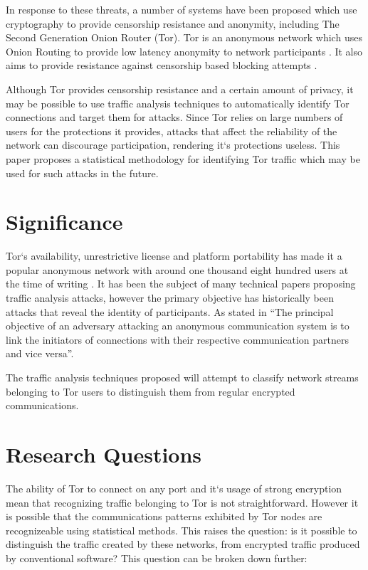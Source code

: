 \documentclass{conference}
\begin{document}
In response to these threats, a number of systems have been proposed which use cryptography to provide censorship resistance and anonymity, including The Second Generation Onion Router (Tor). Tor is an anonymous network which uses Onion Routing to provide low latency anonymity to network participants \parencite{Dingledine:2004p314}. It also aims to provide resistance against censorship based blocking attempts \parencite{Dingledine:2008p1542}.

Although Tor provides censorship resistance and a certain amount of privacy, it may be possible to use traffic analysis techniques to automatically identify Tor connections and target them for attacks. Since Tor relies on large numbers of users for the protections it provides, attacks that affect the reliability of the network can discourage participation, rendering it`s protections useless. This paper proposes a statistical methodology for identifying Tor traffic which may be used for such attacks in the future.

\section{Significance}

Tor`s availability, unrestrictive license and platform portability has made it a popular anonymous network with around one thousand eight hundred users at the time of writing \parencite{website:tor-anonymity-online}. It has been the subject of many technical papers proposing traffic analysis attacks, however the primary objective has historically been attacks that reveal the identity of participants. As stated in \textcite{Murdoch:2005p325} ``The principal objective of an adversary attacking an anonymous communication system is to link the initiators of connections with their respective communication partners and vice versa''.

The traffic analysis techniques proposed will attempt to classify network streams belonging to Tor users to distinguish them from regular encrypted communications.

\section{Research Questions}

The ability of Tor to connect on any port and it`s usage of strong encryption mean that recognizing traffic belonging to Tor is not straightforward. However it is possible that the communications patterns exhibited by Tor nodes are recognizeable using statistical methods. This raises the question: is it possible to distinguish the traffic created by these networks, from encrypted traffic produced by conventional software? This question can be broken down further:
\end{document}
